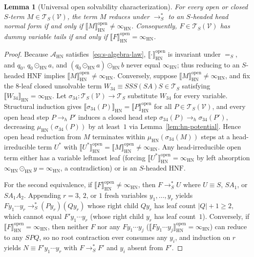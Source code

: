 \documentclass[11pt,reqno]{amsart}
\numberwithin{equation}{section}
\theoremstyle{plain}
\newtheorem{lemma}[theorem]{Lemma}
\theoremstyle{definition}
\theoremstyle{remark}
\newcommand{\TS}{\mathcal{T}_S}
\newcommand{\TSV}{\mathcal{T}_S(\mathcal{V})}
\newcommand{\HNF}{\mathrm{HNF}}
\newcommand{\HN}{\mathrm{HN}}
\newcommand{\sem}[1]{\llbracket #1 \rrbracket}
\newcommand{\redSs}{\to_S^*}
\newcommand{\convS}{=_S}
\begin{document}
\begin{lemma}[Universal open solvability characterization]\label{lem:open-solvability}
For every open or closed $S$-term $M \in \TSV$, the term $M$ reduces under $\redSs$ to an $S$-headed head normal form if and only if $\sem{M}_{\HN}^{\mathrm{open}} \neq \infty_{\HN}$. Consequently, $F \in \TSV$ has dummy variable tails if and only if $\sem{F}_{\HN}^{\mathrm{open}} = \infty_{\HN}$.
\end{lemma}

\begin{proof}
Because $\mathcal{A}_{\HN}$ satisfies~\eqref{eq:s-algebra-law}, $\sem{\cdot}_{\HN}^{\mathrm{open}}$ is invariant under $\convS$, and $q_0$, $q_0 \odot_{\HN} a$, and $(q_0 \odot_{\HN} a) \odot_{\HN} b$ never equal $\infty_{\HN}$; thus reducing to an $S$-headed $\HNF$ implies $\sem{M}_{\HN}^{\mathrm{open}} \neq \infty_{\HN}$. Conversely, suppose $\sem{M}_{\HN}^{\mathrm{open}} \neq \infty_{\HN}$, and fix the $8$-leaf closed unsolvable term $W_{34} \equiv S S S (S A) S \in \TS$ satisfying $\sem{W_{34}}_{\HN} = \infty_{\HN}$. Let $\sigma_{34} \colon \TSV \to \TS$ substitute $W_{34}$ for every variable. Structural induction gives $\sem{\sigma_{34}(P)}_{\HN} = \sem{P}_{\HN}^{\mathrm{open}}$ for all $P \in \TSV$, and every open head step $P \to_h P'$ induces a closed head step $\sigma_{34}(P) \to_h \sigma_{34}(P')$, decreasing $\mu_{\HN}(\sigma_{34}(P))$ by at least~$1$ via Lemma~\ref{lem:hn-potential}. Hence open head reduction from $M$ terminates within $\mu_{\HN}(\sigma_{34}(M))$ steps at a head-irreducible term $U^*$ with $\sem{U^*}_{\HN}^{\mathrm{open}} = \sem{M}_{\HN}^{\mathrm{open}} \neq \infty_{\HN}$. Any head-irreducible open term either has a variable leftmost leaf (forcing $\sem{U^*}_{\HN}^{\mathrm{open}} = \infty_{\HN}$ by left absorption $\infty_{\HN} \odot_{\HN} y = \infty_{\HN}$, a contradiction) or is an $S$-headed $\HNF$.

For the second equivalence, if $\sem{F}_{\HN}^{\mathrm{open}} \neq \infty_{\HN}$, then $F \redSs U$ where $U \equiv S$, $S A_1$, or $S A_1 A_2$. Appending $r = 3$, $2$, or $1$ fresh variables $y_1, \dots, y_r$ yields $F y_1 \cdots y_r \redSs (P y_r)(Q y_r)$ whose right child $Q y_r$ has leaf count $|Q| + 1 \ge 2$, which cannot equal $F' y_1 \cdots y_r$ (whose right child $y_r$ has leaf count~$1$). Conversely, if $\sem{F}_{\HN}^{\mathrm{open}} = \infty_{\HN}$, then neither $F$ nor any $F y_1 \cdots y_j$ ($\sem{F y_1 \cdots y_j}_{\HN}^{\mathrm{open}} = \infty_{\HN}$) can reduce to any $S P Q$, so no root contraction ever consumes any $y_i$, and induction on $r$ yields $N \equiv F' y_1 \cdots y_r$ with $F \redSs F'$ and $y_i$ absent from $F'$.
\end{proof}
\end{document}
